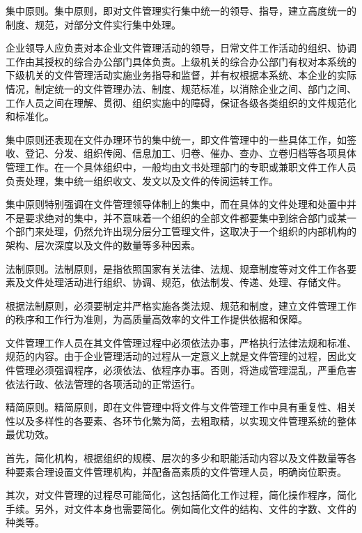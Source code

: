     \begin{enumerate.zh}
        \item 集中原则。集中原则，即对文件管理实行集中统一的领导、指导，建立高度统一的制度、规范，对部分文件实行集中处理。

        企业领导人应负责对本企业文件管理活动的领导，日常文件工作活动的组织、协调工作由其授权的综合办公部门具体负责。上级机关的综合办公部门有权对本系统的下级机关的文件管理活动实施业务指导和监督，并有权根据本系统、本企业的实际情况，制定统一的文件管理办法、制度、规范标准，以消除企业之间、部门之间、工作人员之间在理解、贯彻、组织实施中的障碍，保证各级各类组织的文件规范化和标准化。

        集中原则还表现在文件办理环节的集中统一，即文件管理中的一些具体工作，如签收、登记、分发、组织传阅、信息加工、归卷、催办、查办、立卷归档等各项具体管理工作。在一个具体组织中，一般均由文书处理部门的专职或兼职文件工作人员负责处理，集中统一组织收文、发文以及文件的传阅运转工作。

        集中原则特别强调在文件管理领导体制上的集中，而在具体的文件处理和处置中并不是要求绝对的集中，并不意味着一个组织的全部文件都要集中到综合部门或某一个部门来处理，仍然允许出现分层分工管理文件，这取决于一个组织的内部机构的架构、层次深度以及文件的数量等多种因素。

        \item 法制原则。法制原则，是指依照国家有关法律、法规、规章制度等对文件工作各要素及文件处理活动进行组织、协调、规范，依法制发、传递、处理、存储文件。

        根据法制原则，必须要制定并严格实施各类法规、规范和制度，建立文件管理工作的秩序和工作行为准则，为高质量高效率的文件工作提供依据和保障。

        文件管理工作人员在其文件管理过程中必须依法办事，严格执行法律法规和标准、规范的内容。由于企业管理活动的过程从一定意义上就是文件管理的过程，因此文件管理必须强调程序，必须依法、依程序办事。否则，将造成管理混乱，严重危害依法行政、依法管理的各项活动的正常运行。

        \item 精简原则。精简原则，即在文件管理中将文件与文件管理工作中具有重复性、相关性以及多样性的各要素、各环节化繁为简，去粗取精，以实现文件管理系统的整体最优功效。

        首先，简化机构，根据组织的规模、层次的多少和职能活动内容以及文件数量等各种要素合理设置文件管理机构，并配备高素质的文件管理人员，明确岗位职责。

        其次，对文件管理的过程尽可能简化，这包括简化工作过程，简化操作程序，简化手续。另外，对文件本身也需要简化。例如简化文件的结构、文件的字数、文件的种类等。


\end{enumerate.zh}
